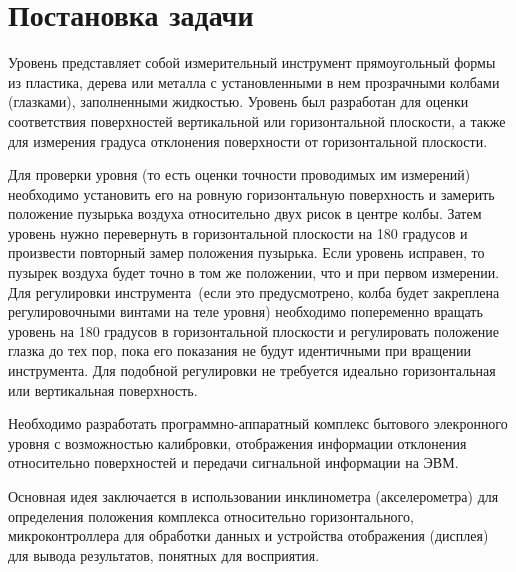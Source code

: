 \documentclass[document.tex]{subfiles}
\begin{document}
\section{Постановка задачи}
Уровень представляет собой измерительный инструмент прямоугольный фор\-мы из
пла\-стика, дерева или металла с установленными в нем прозрачными колбами
(глазками), запол\-ненными жидкостью. Уровень был разработан для оценки
соответствия поверхностей верти\-кальной или горизонтальной плоскости, а также
для измерения градуса отклонения поверх\-ности от горизонтальной плоскости.

Для проверки уровня (то есть оценки точности проводимых им измерений) необходимо
установить его на ровную горизонтальную поверхность и замерить положение
пузырька воздуха относительно двух рисок в центре колбы. Затем уровень нужно
перевернуть в горизонтальной плоскости на 180 градусов и произвести повторный
замер положения пузырь\-ка. Если уровень исправен, то пузырек воздуха будет точно
в том же положении, что и при первом измерении. Для регулировки
инструмента~(если это предусмотрено, колба будет закреплена регулировочными
винтами на теле уровня) необходимо попеременно вращать уровень на 180 градусов в
горизонтальной плоскости и регулировать положение глазка до тех пор, пока его
показания не будут идентичными при вращении инструмента. Для подобной
регулировки не требуется идеально горизонтальная или вертикальная
поверхность.\cite{spiritlevel_info}

Необходимо разработать программно-аппаратный комплекс бытового элек\-ронного
уров\-ня с возможностью калибровки, отображения информации откло\-нения относительно
поверх\-ностей и передачи сигнальной информации на ЭВМ.

Основная идея заключается в использовании инклинометра (акселерометра) для опреде\-ления положения комплекса относительно горизонтального, микро\-контроллера для обработки данных
и устройства отображения (дисплея) для вывода результатов, понятных для воспри\-ятия.
\end{document}
